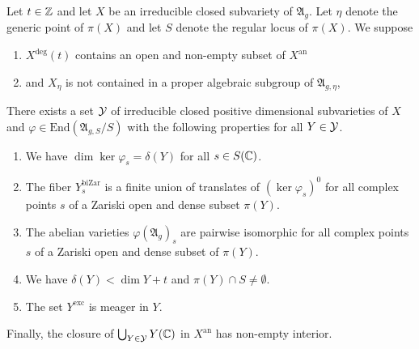 \documentclass[12pt,oneside]{amsart}
\begin{document}
\begin{proposition}
  \label{prop:deg}
  Let $t\in {\mathbb{Z}}$
  and let $X$ be an irreducible closed subvariety of $\mathfrak{A}_g$.
  Let $\eta$ denote the generic point of $\pi(X)$ and let $S$ denote
  the regular locus of $\pi(X)$.
  We suppose
  \begin{enumerate}
  \item [(a)]
    $X^{\mathrm{deg}}(t)$ contains an open and non-empty subset of
    $X^{\mathrm{an}}$
  \item[(b)] and
    $X_\eta$ is not contained in a proper algebraic subgroup of
    $\mathfrak{A}_{g,\eta}$,
  \end{enumerate}
  There exists a set ${\mathcal Y}$ of irreducible closed
  positive dimensional subvarieties 
  of $X$ and $\varphi \in \mathrm{End}(\mathfrak{A}_{g,S}/S)$
  with the following properties for all $Y\in{\mathcal Y}$.
  \begin{enumerate}
  \item[(i)] We have
    $\dim \ker\varphi_s= \delta(Y)$ for all $s\in S({\mathbb{C}})$.
  \item[(ii)] The fiber  $Y^{\mathrm{biZar}}_s$ is
    a finite union of translates of $(\ker\varphi_s)^0$ for all
    complex points $s$ of a Zariski open and dense subset $\pi(Y)$. 
  \item[(iii)] The abelian varieties $\varphi(\mathfrak{A}_{g})_s$ are
    pairwise isomorphic for all complex points $s$ of a Zariski open and
    dense subset of $\pi(Y)$.
  \item[(iv)]
    We have $\delta(Y) < \dim Y + t$ and $\pi(Y)\cap S\not=\emptyset$.
  \item[(v)]
    The set $Y^{\mathrm{exc}}$ is
    meager in $Y$.
  \end{enumerate}
  Finally, the closure of $\bigcup_{Y\in {\mathcal Y}} Y({\mathbb{C}})$ in
  $X^{\mathrm{an}}$ has non-empty interior.
\end{proposition}
\end{document}
